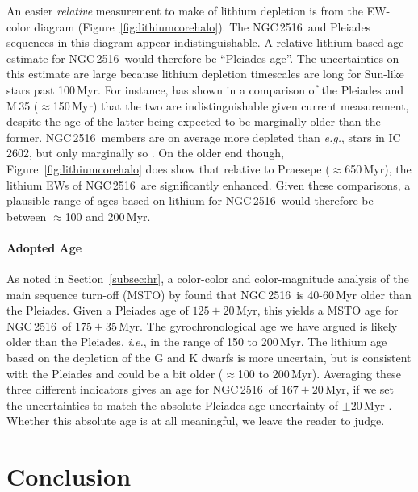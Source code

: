 \documentclass[12pt,twocolumn,tighten]{aastex63}
\newcommand{\cn}{NGC\,2516} %
\begin{document}
An easier {\it relative} measurement to make of lithium depletion is
from the EW-color diagram (Figure~\ref{fig:lithiumcorehalo}).  The
\cn\ and Pleiades sequences in this diagram appear indistinguishable.
A relative lithium-based age estimate for \cn\ would therefore be
``Pleiades-age''.  The uncertainties on this estimate are large
because lithium depletion timescales are long for Sun-like stars past
100\,Myr.  For instance, \citet{jeffries_m35_li_2020} has shown in a
comparison of the Pleiades and M\,35 ($\approx$150\,Myr) that the two
are indistinguishable given current measurement, despite the age of
the latter being expected to be marginally older than the former.
\cn\ members are on average more depleted than {\it e.g.}, stars in
IC\,2602, but only marginally so \citep{soderblom_ages_2014}.  On the
older end though, Figure~\ref{fig:lithiumcorehalo} does show that
relative to Praesepe ($\approx$650\,Myr), the lithium EWs of \cn\ are
significantly enhanced.  Given these comparisons, a plausible range of
ages based on lithium for \cn\ would therefore be between $\approx$100
and 200\,Myr.

\paragraph{Adopted Age}
As noted in Section~\ref{subsec:hr}, a color-color and color-magnitude analysis of the
main sequence turn-off (MSTO) by \citet{cummings_2018} found that \cn\
is 40-60\,Myr older than the Pleiades.  Given a Pleiades age of
$125\pm20$\,Myr, this yields a MSTO age for \cn\ of $175\pm35$\,Myr.
The gyrochronological age we have argued is likely older than the
Pleiades, {\it i.e.}, in the range of 150 to 200\,Myr.  The lithium
age based on the depletion of the G and K dwarfs is more uncertain,
but is consistent with the Pleiades and could be a bit older
($\approx$100 to 200\,Myr).  Averaging these three different
indicators gives an age for \cn\ of $167\pm20$\,Myr, if we set the
uncertainties to match the absolute Pleiades age uncertainty of $\pm
20\,$Myr \citep{soderblom_ages_2014}.  Whether this absolute age is at
all meaningful, we leave the reader to judge.



\section{Conclusion}
\label{sec:conclusion}
\end{document}
